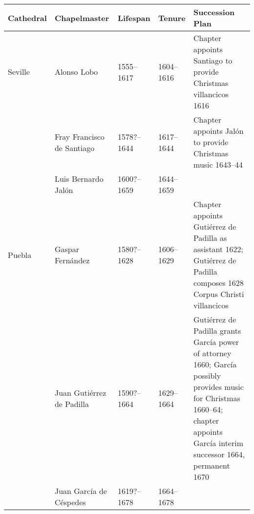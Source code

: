 \bgroup
\renewcommand{\arraystretch}{1.5}
\begin{tabulary}{\textwidth}{llllL}
    \toprule
    Cathedral & Chapelmaster & Lifespan & Tenure & Succession Plan\\
    \midrule

    Seville & Alonso Lobo & 1555--1617 & 1604--1616 
    & Chapter appoints Santiago to provide Christmas villancicos 1616\\

    & Fray Francisco de Santiago & 1578?--1644 & 1617--1644
    & Chapter appoints Jalón to provide Christmas music 1643--44\\

    & Luis Bernardo Jalón & 1600?--1659 & 1644--1659 & \\\midrule
    
    Puebla & Gaspar Fernández & 1580?--1628 & 1606--1629
    & Chapter appoints Gutiérrez de Padilla as assistant 1622; Gutiérrez de
    Padilla composes 1628 Corpus Christi villancicos\\

    & Juan Gutiérrez de Padilla & 1590?--1664 & 1629--1664 
    & Gutiérrez de Padilla grants García power of attorney 1660; García
    possibly provides music for Christmas 1660--64; chapter appoints García
    interim successor 1664, permanent 1670\\

    & Juan García de Céspedes & 1619?--1678 & 1664--1678 & \\
    \bottomrule
\end{tabulary}
\egroup
\endinput
